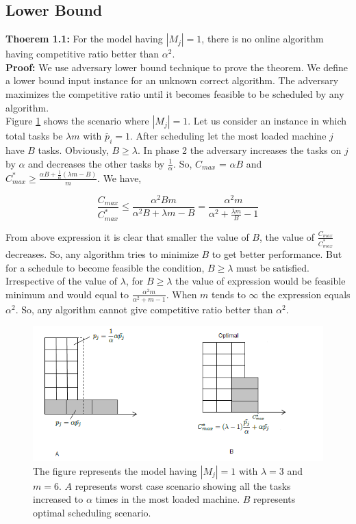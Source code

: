 \documentclass[10pt, conference, compsocconf]{IEEEtran}
\begin{document}
                                                                                      
\subsection{Lower Bound}

\textbf{Thoerem 1.1:} For the model having $|M_j| = 1$, there
is no online algorithm having competitive ratio better than $\alpha^{2} $.\\
\textbf{Proof:} We use adversary lower bound technique to
prove the theorem. We define a lower bound input
instance for an unknown correct algorithm. The
adversary maximizes the competitive ratio until it
becomes feasible to be scheduled by any algorithm.\\
 
Figure \ref{fig:rara} shows the scenario where $|M_j|=1$.  Let us consider an instance in which total tasks be $\lambda m$ with $\tilde{p_i}=1$. After scheduling let the most loaded machine $j$ have $B$ tasks. Obviously, $B \geq \lambda$. In phase 2 the adversary  increases the tasks on $j$ by $\alpha$ and decreases the other tasks by $\frac{1}{\alpha}$. So, $ C_{max}$ = $\alpha B$ and ${C^{*}_{max}}\geq \frac{\alpha B + \frac{1}{\alpha }  (\lambda  m - B) }{m}$. We have,
 
 \begin{equation}\nonumber
\frac{C_{max}}{C^{*}_{max}}\leq \frac{\alpha^{2} B m }{\alpha^{2} B + \lambda m - B}=\frac{\alpha^{2}  m }{\alpha^{2}  + \frac{\lambda m}{B}  - 1}
 \end{equation} 
 
  From above expression it is clear that smaller the value of $B$, the value of $\frac{C_{max}}{C^{*}_{max}}$ decreases. So, any algorithm
  tries to minimize $B$ to get better performance.  But for a schedule to become feasible the condition, $B \geq \lambda$ must  be satisfied. Irrespective of the value of $\lambda$, for $ B \geq \lambda $ the value of expression would be feasible minimum and would equal to   $\frac{\alpha^{2}m }{\alpha^{2} + m-1}$. When $m$ tends to $\infty$ the expression  equals $\alpha^2$. So, any algorithm cannot give competitive ratio better than $\alpha^2$.  
  
  
  \begin{figure}[htp]
  \centering
  \includegraphics[width= 8 cm]{fig1}
  \caption{ The figure represents the model having $|M_j|= 1$ with
  $\lambda = 3$ and $m = 6$. $A$ represents worst case scenario showing all the tasks increased to $\alpha$ times in the most loaded machine. $B$ represents   optimal scheduling scenario.  }
  \label{fig:rara}
  \end{figure}
 
\end{document}
